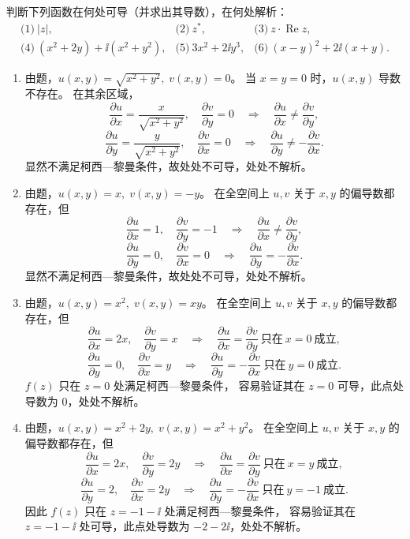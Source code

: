 \begin{question}
判断下列函数在何处可导（并求出其导数），在何处解析：
\[
\begin{array}{lll}
\text{(1)}\ |z|, & \text{(2)}\ z^*, & \text{(3)}\ z\cdot\operatorname{Re}z,\\[2pt]
\text{(4)}\ (x^2+2y)+\ii(x^2+y^2), & \text{(5)}\ 3x^2+2\ii y^3, & \text{(6)}\ (x-y)^2+2\ii(x+y).
\end{array}
\]
\begin{solution}
\begin{enumerate}
  \item 由题，\(u(x,y)=\sqrt{x^2+y^2},\;v(x,y)=0\)。
  当 \(x=y=0\) 时，\(u(x,y)\) 导数不存在。
  在其余区域，
  \[
  \frac{\partial u}{\partial x}=\frac{x}{\sqrt{x^2+y^2}},\quad
  \frac{\partial v}{\partial y}=0\quad\Longrightarrow\quad
  \frac{\partial u}{\partial x}\neq\frac{\partial v}{\partial y},
  \]
  \[
  \frac{\partial u}{\partial y}=\frac{y}{\sqrt{x^2+y^2}},\quad
  \frac{\partial v}{\partial x}=0\quad\Longrightarrow\quad
  \frac{\partial u}{\partial y}\neq-\frac{\partial v}{\partial x}.
  \]
  显然不满足柯西—黎曼条件，故处处不可导，处处不解析。

  \item 由题，\(u(x,y)=x,\;v(x,y)=-y\)。
  在全空间上 \(u,v\) 关于 \(x,y\) 的偏导数都存在，但
  \[
  \frac{\partial u}{\partial x}=1,\quad
  \frac{\partial v}{\partial y}=-1\quad\Longrightarrow\quad
  \frac{\partial u}{\partial x}\neq\frac{\partial v}{\partial y},
  \]
  \[
  \frac{\partial u}{\partial y}=0,\quad
  \frac{\partial v}{\partial x}=0\quad\Longrightarrow\quad
  \frac{\partial u}{\partial y}=-\frac{\partial v}{\partial x}.
  \]
  显然不满足柯西—黎曼条件，故处处不可导，处处不解析。

  \item 由题，\(u(x,y)=x^2,\;v(x,y)=xy\)。
  在全空间上 \(u,v\) 关于 \(x,y\) 的偏导数都存在，但
  \[
  \frac{\partial u}{\partial x}=2x,\quad
  \frac{\partial v}{\partial y}=x\quad\Longrightarrow\quad
  \frac{\partial u}{\partial x}=\frac{\partial v}{\partial y}\ \text{只在}\ x=0\ \text{成立},
  \]
  \[
  \frac{\partial u}{\partial y}=0,\quad
  \frac{\partial v}{\partial x}=y\quad\Longrightarrow\quad
  \frac{\partial u}{\partial y}=-\frac{\partial v}{\partial x}\ \text{只在}\ y=0\ \text{成立}.
  \]
  \(f(z)\) 只在 \(z=0\) 处满足柯西—黎曼条件，
  容易验证其在 \(z=0\) 可导，此点处导数为 \(0\)，处处不解析。

  \item 由题，\(u(x,y)=x^2+2y,\;v(x,y)=x^2+y^2\)。
  在全空间上 \(u,v\) 关于 \(x,y\) 的偏导数都存在，但
  \[
  \frac{\partial u}{\partial x}=2x,\quad
  \frac{\partial v}{\partial y}=2y\quad\Longrightarrow\quad
  \frac{\partial u}{\partial x}=\frac{\partial v}{\partial y}\ \text{只在}\ x=y\ \text{成立},
  \]
  \[
  \frac{\partial u}{\partial y}=2,\quad
  \frac{\partial v}{\partial x}=2y\quad\Longrightarrow\quad
  \frac{\partial u}{\partial y}=-\frac{\partial v}{\partial x}\ \text{只在}\ y=-1\ \text{成立}.
  \]
  因此 \(f(z)\) 只在 \(z=-1-\ii\) 处满足柯西—黎曼条件，
  容易验证其在 \(z=-1-\ii\) 处可导，此点处导数为 \(-2-2\ii\)，处处不解析。


\end{enumerate}
\end{solution}
\end{question}
